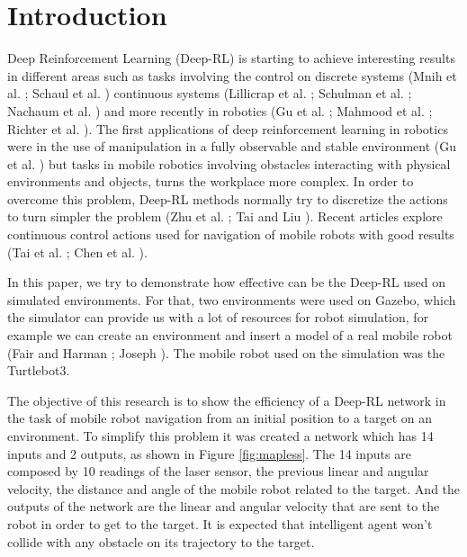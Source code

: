 \section*{Introduction}
Deep Reinforcement Learning (Deep-RL) is starting to achieve interesting results in different areas such as tasks involving the control on discrete systems (Mnih et al. \citeyear{mnih2013playing}; Schaul et al. \citeyear{schaul2015prioritized}) continuous systems (Lillicrap et al. \citeyear{lillicrap2015continuous}; Schulman et al. \citeyear{schulman2015high}; Nachaum et al. \citeyear{nachum2017trust})
and more recently in robotics (Gu et al. \citeyear{gu2017deep}; Mahmood et al. \citeyear{mahmood2018benchmarking}; Richter et al. \citeyear{richter2019open}).
The first applications of deep reinforcement learning in robotics were in the use of manipulation in a  fully observable and stable environment (Gu et al. \citeyear{gu2016continuous}) but tasks in mobile robotics involving obstacles interacting with physical environments and objects, turns the workplace more complex.
In order to overcome this problem, Deep-RL methods normally try to discretize the actions to turn simpler the problem (Zhu et al. \citeyear{zhu2017target}; Tai and Liu \citeyear{tai2016towards}).
Recent articles explore continuous control actions used for navigation of mobile robots with good results (Tai et al. \citeyear{tai2017virtual}; Chen et al. \citeyear{chen2017socially}).

In this paper, we try to demonstrate how effective can be the Deep-RL used on simulated environments.
For that, two environments were used on Gazebo, which the simulator can provide us with a lot of resources for robot simulation, for example we can create an environment and insert a model of a real mobile robot (Fair and Harman \citeyear{fairchild2016ros}; Joseph \citeyear{joseph2015mastering}). 
The mobile robot used on the simulation was the Turtlebot3.

The objective of this research is to show the efficiency of a Deep-RL network in the task of mobile robot navigation from an initial position to a target on an environment.
To simplify this problem it was created a network which has 14 inputs and 2 outputs, as shown in {\color{blue}Figure} \ref{fig:mapless}.
The 14 inputs are composed by 10 readings of the laser sensor, the previous linear and angular velocity, the distance and angle of the mobile robot related to the target.
And the outputs of the network are the linear and angular velocity that are sent to the robot in order to get to the target.
It is expected that intelligent agent won't collide with any obstacle on its trajectory to the target.

